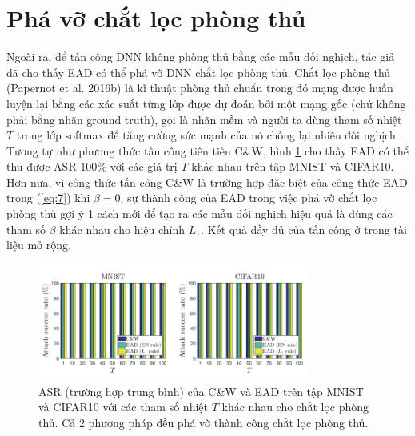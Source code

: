 \section{Phá vỡ chắt lọc phòng thủ}
Ngoài ra, để tấn công DNN không phòng thủ bằng các mẫu đối nghịch, tác giả đã cho thấy EAD có thể phá vỡ DNN chắt lọc phòng thủ. Chắt lọc phòng thủ (Papernot et al. 2016b) là kĩ thuật phòng thủ chuẩn trong đó mạng được huấn luyện lại bằng các xác suất từng lớp được dự đoán bởi một mạng gốc (chứ không phải bằng nhãn ground truth), gọi là nhãn mềm và người ta dùng tham số nhiệt $T$ trong lớp softmax để tăng cường sức mạnh của nó chống lại nhiễu đối nghịch. Tương tự như phương thức tấn công tiên tiến C\&W, hình \ref{fig:fg_03} cho thấy EAD có thể thu được ASR $100\%$ với các giá trị $T$ khác nhau trên tập MNIST và CIFAR10. Hơn nữa, vì công thức tấn công C\&W là trường hợp đặc biệt của công thức EAD trong (\ref{eq:7}) khi $\beta = 0$, sự thành công của EAD trong việc phá vỡ chắt lọc phòng thủ gợi ý 1 cách mới để tạo ra các mẫu đối nghịch hiệu quả là dùng các tham số  $\beta$ khác nhau cho hiệu chỉnh $L_1$. Kết quả đầy đủ của tấn công ở trong tài liệu mở rộng.

\begin{figure}[H] %
    \centering %
    \includegraphics[width=0.8\textwidth]{assets/fig_3.png} 
    \caption{ASR (trường hợp trung bình) của C\&W và EAD trên tập MNIST và CIFAR10 với các tham số nhiệt $T$ khác nhau cho chắt lọc phòng thủ. Cả 2 phương pháp đều phá vỡ thành công chắt lọc phòng thủ.} %
    \label{fig:fg_03}
\end{figure}